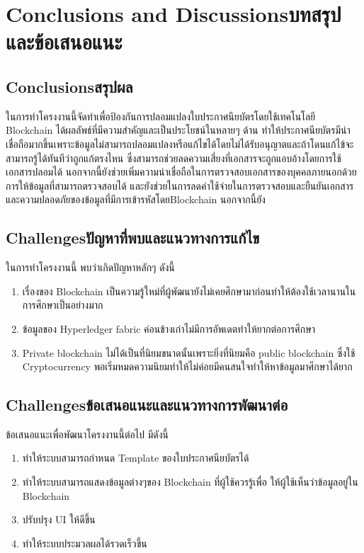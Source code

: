 \chapter{\ifenglish Conclusions and Discussions\else บทสรุปและข้อเสนอแนะ\fi}

\section{\ifenglish Conclusions\else สรุปผล\fi}
\enskip \enskip \enskip \enskip \enskip
ในการทำโครงงานนี้จัดทำเพื่อป้องกันการปลอมแปลงใบประกาศนียบัตรโดยใช้เทคโนโลยี Blockchain ได้ผลลัพธ์ที่มีความสําคัญและเป็นประโยชน์ในหลายๆ ด้าน ทำให้ประกาศนียบัตรมีน่าเชื่อถือมากขึ้นเพราะข้อมูลไม่สามารถปลอมแปลงหรือแก้ไขได้โดยไม่ได้รับอนุญาตและถ้าโดนแก้ไข้จะสามารถรู้ได้ทันทีว่าถูกแก้ตรงไหน ซึ่งสามารถช่วยลดความเสี่ยงที่เอกสารจะถูกแอบอ้างโดยการใช้เอกสารปลอมได้ นอกจากนี้ยังช่วยเพิ่มความน่าเชื่อถือในการตรวจสอบเอกสารของบุคคลภายนอกด้วยการให้ข้อมูลที่สามารถตรวจสอบได้
และยังช่วยในการลดค่าใช้จ่ายในการตรวจสอบและยืนยันเอกสารและความปลอดภัยของข้อมูลที่มีการเข้ารหัสโดยBlockchain
นอกจากนี้ยัง


\section{\ifenglish Challenges\else ปัญหาที่พบและแนวทางการแก้ไข\fi}
\enskip \enskip \enskip \enskip \enskip
ในการทำโครงงานนี้ พบว่าเกิดปัญหาหลักๆ ดังนี้
\begin{enumerate}
    \item เรื่องของ Blockchain เป็นความรู้ใหม่ที่ผู้พัฒนายังไม่เคยศึกษามาก่อนทำให้ต้องใช้เวลานานในการศึกษาเป็นอย่างมาก
    \item ข้อมูลของ Hyperledger fabric ค่อนข้างเก่าไม่มีการอัพเดตทำให้ยากต่อการศึกษา
    \item Private blockchain ไม่ได้เป็นที่นิยมขนาดนั้นเพราะยิ่งที่นิยมคือ public blockchain ซึ่งใช้ Cryptocurrency พอเริ่มหมดความนิยมทำให้ไม่ค่อยมีคนสนใจทำให้หาข้อมูลมาศึกษาได้ยาก
\end{enumerate}

\section{\ifenglish Challenges\else ข้อเสนอแนะและแนวทางการพัฒนาต่อ\fi}
\enskip \enskip \enskip \enskip \enskip
ข้อเสนอแนะเพื่อพัฒนาโครงงานนี้ต่อไป มีดังนี้
\begin{enumerate}
    \item ทำให้ระบบสามารถกำหนด Template ของใบประกาศนียบัตรได้
    \item ทำให้ระบบสามารถแสดงข้อมูลต่างๆของ Blockchain ที่ผู้ใช้ควรรู้เพื่อ
    ให้ผู้ใช้เห็นว่าข้อมูลอยู่ใน Blockchain
    \item ปรับปรุง UI ให้ดีขึ้น
    \item ทำให้ระบบประมวลผลได้รวดเร็วขึ้น
\end{enumerate}
